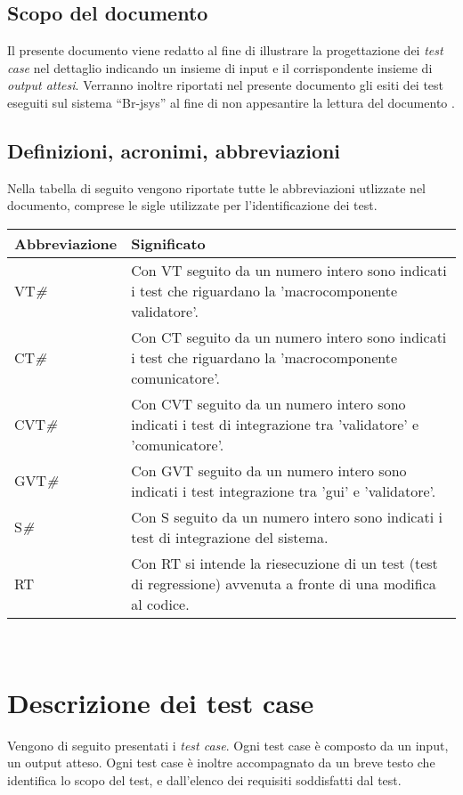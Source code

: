 \section{Scopo del documento}
Il presente documento viene redatto al fine di illustrare la progettazione dei \textit{test case} nel dettaglio indicando un insieme di input e il corrispondente insieme di \textit{output attesi}. Verranno inoltre riportati nel presente documento gli esiti dei test eseguiti sul sistema ``Br-jsys'' al fine di non appesantire la lettura del documento \PdQ .

\section{Definizioni, acronimi, abbreviazioni}
Nella tabella di seguito vengono riportate tutte le abbreviazioni utlizzate nel documento, comprese le sigle utilizzate per l'identificazione dei test.
\begin{center}
\begin{tabular}{||p{3.0cm}||p{8.5cm}||} \hline
\textbf{Abbreviazione} & \textbf{Significato} \\ \hline

VT\textit{\#} & Con VT seguito da un numero intero sono indicati i test che riguardano la 'macrocomponente validatore'.\\ \hline
CT\textit{\#} & Con CT seguito da un numero intero sono indicati i test che riguardano la 'macrocomponente comunicatore'.\\ \hline
CVT\textit{\#} & Con CVT seguito da un numero intero sono indicati i test di integrazione tra 'validatore' e 'comunicatore'.\\ \hline
GVT\textit{\#} & Con GVT seguito da un numero intero sono indicati i test integrazione tra 'gui' e 'validatore'.\\ \hline
S\textit{\#} & Con S seguito da un numero intero sono indicati i test di integrazione del sistema.\\ \hline
RT\textit{} & Con RT si intende la riesecuzione di un test (test di regressione) avvenuta a fronte di una modifica al codice.\\ \hline

\end{tabular} \\
\end{center}

\chapter{Descrizione dei test case}
Vengono di seguito presentati i \textit{test case}. Ogni test case \`e composto da un input, un output atteso. Ogni test case \`e inoltre accompagnato da un breve testo che identifica lo scopo del test, e dall'elenco dei requisiti soddisfatti dal test.


